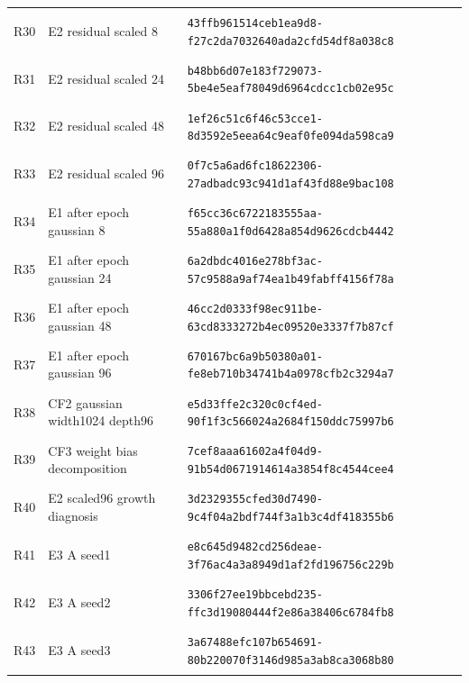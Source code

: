 \begin{longtable}{@{}l>{\raggedright\arraybackslash}p{3.5cm}p{10.8cm}@{}}
\hypertarget{R30}{R30} & E2 residual scaled 8 & {\fontsize{8.8}{11}\selectfont\texttt{43ffb961514ceb1ea9d8-f27c2da7032640ada2cfd54df8a038c8}} \\
\hypertarget{R31}{R31} & E2 residual scaled 24 & {\fontsize{8.8}{11}\selectfont\texttt{b48bb6d07e183f729073-5be4e5eaf78049d6964cdcc1cb02e95c}} \\
\hypertarget{R32}{R32} & E2 residual scaled 48 & {\fontsize{8.8}{11}\selectfont\texttt{1ef26c51c6f46c53cce1-8d3592e5eea64c9eaf0fe094da598ca9}} \\
\hypertarget{R33}{R33} & E2 residual scaled 96 & {\fontsize{8.8}{11}\selectfont\texttt{0f7c5a6ad6fc18622306-27adbadc93c941d1af43fd88e9bac108}} \\
\hypertarget{R34}{R34} & E1 after epoch gaussian 8 & {\fontsize{8.8}{11}\selectfont\texttt{f65cc36c6722183555aa-55a880a1f0d6428a854d9626cdcb4442}} \\
\hypertarget{R35}{R35} & E1 after epoch gaussian 24 & {\fontsize{8.8}{11}\selectfont\texttt{6a2dbdc4016e278bf3ac-57c9588a9af74ea1b49fabff4156f78a}} \\
\hypertarget{R36}{R36} & E1 after epoch gaussian 48 & {\fontsize{8.8}{11}\selectfont\texttt{46cc2d0333f98ec911be-63cd8333272b4ec09520e3337f7b87cf}} \\
\hypertarget{R37}{R37} & E1 after epoch gaussian 96 & {\fontsize{8.8}{11}\selectfont\texttt{670167bc6a9b50380a01-fe8eb710b34741b4a0978cfb2c3294a7}} \\
\hypertarget{R38}{R38} & CF2 gaussian width1024 depth96 & {\fontsize{8.8}{11}\selectfont\texttt{e5d33ffe2c320c0cf4ed-90f1f3c566024a2684f150ddc75997b6}} \\
\hypertarget{R39}{R39} & CF3 weight bias decomposition & {\fontsize{8.8}{11}\selectfont\texttt{7cef8aaa61602a4f04d9-91b54d0671914614a3854f8c4544cee4}} \\
\hypertarget{R40}{R40} & E2 scaled96 growth diagnosis & {\fontsize{8.8}{11}\selectfont\texttt{3d2329355cfed30d7490-9c4f04a2bdf744f3a1b3c4df418355b6}} \\
\hypertarget{R41}{R41} & E3 A seed1 & {\fontsize{8.8}{11}\selectfont\texttt{e8c645d9482cd256deae-3f76ac4a3a8949d1af2fd196756c229b}} \\
\hypertarget{R42}{R42} & E3 A seed2 & {\fontsize{8.8}{11}\selectfont\texttt{3306f27ee19bbcebd235-ffc3d19080444f2e86a38406c6784fb8}} \\
\hypertarget{R43}{R43} & E3 A seed3 & {\fontsize{8.8}{11}\selectfont\texttt{3a67488efc107b654691-80b220070f3146d985a3ab8ca3068b80}} \\

\end{longtable}
